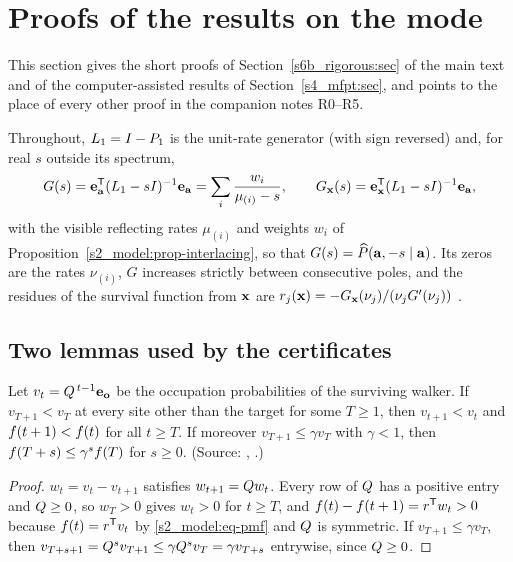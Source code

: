 \section{Proofs of the results on the mode}\label{appD_rigorous:sec}

This section gives the short proofs of Section~\ref{s6b_rigorous:sec} of the main text and of the computer-assisted
results of Section~\ref{s4_mfpt:sec}, and points to the place of every other proof in the companion notes R0--R5.

Throughout, $L_1=I-P_1$ is the unit-rate generator (with sign reversed) and, for real $s$ outside its spectrum,
\[
G(s)=\mathbf{e}_{\mathbf{a}}^{\mathsf{T}}(L_1-sI)^{-1}\mathbf{e}_{\mathbf{a}}=\sum_{i}\frac{w_i}{\mu_{(i)}-s},\qquad
G_{\mathbf{x}}(s)=\mathbf{e}_{\mathbf{x}}^{\mathsf{T}}(L_1-sI)^{-1}\mathbf{e}_{\mathbf{a}},
\]
with the visible reflecting rates $\mu_{(i)}$ and weights $w_i$ of Proposition~\ref{s2_model:prop-interlacing}, so
that $G(s)=\widehat{P}(\mathbf{a},-s\mid\mathbf{a})$. Its zeros are the rates $\nu_{(i)}$, $G$ increases strictly between consecutive
poles, and the residues of the survival function from $\mathbf{x}$ are $r_j(\mathbf{x})=-G_{\mathbf{x}}(\nu_j)/(\nu_jG'(\nu_j))$
.

\subsection{Two lemmas used by the certificates}

\begin{lemma}\label{appD_rigorous:lem-tail}
Let $v_t=Q^{\,t-1}\mathbf{e}_{\mathbf{o}}$ be the occupation probabilities of the surviving walker. If $v_{T+1}<v_T$ at every
site other than the target for some $T\ge1$, then $v_{t+1}<v_t$ and $f(t+1)<f(t)$ for all $t\ge T$. If moreover
$v_{T+1}\le\gamma v_T$ with $\gamma<1$, then $f(T+s)\le\gamma^{s}f(T)$ for $s\ge0$.
\textup{(Source: , .)}
\end{lemma}

\begin{proof}
$w_t=v_t-v_{t+1}$ satisfies $w_{t+1}=Q w_t$. Every row of $Q$ has a positive entry and $Q\ge0$, so
$w_T>0$ gives $w_t>0$ for $t\ge T$, and $f(t)-f(t+1)=r^{\mathsf{T}}w_t>0$ because $f(t)=r^{\mathsf{T}}v_t$ by
\eqref{s2_model:eq-pmf} and $Q$ is symmetric. If $v_{T+1}\le\gamma v_T$, then
$v_{T+s+1}=Q^{s}v_{T+1}\le\gamma Q^{s}v_T=\gamma v_{T+s}$ entrywise, since $Q\ge0$.
\end{proof}

